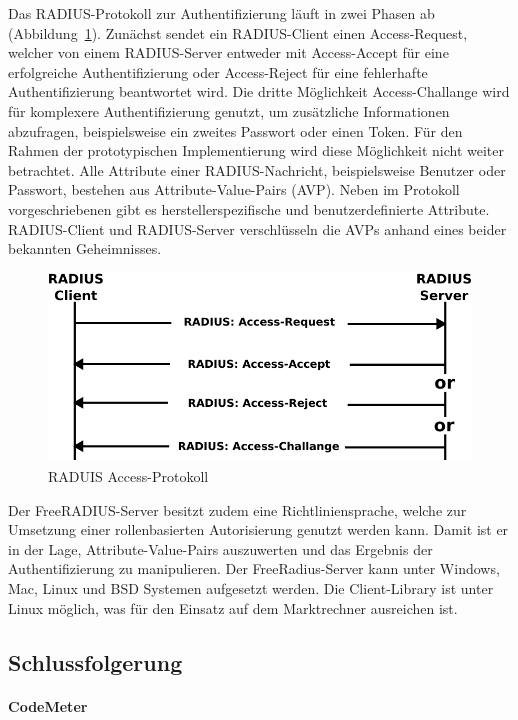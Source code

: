 \documentclass[11pt,a4paper]{report}
\begin{document}
Das RADIUS-Protokoll zur Authentifizierung läuft in zwei Phasen ab (Abbildung~\ref{fig:radius_access}). Zunächst sendet ein RADIUS-Client einen Access-Request, welcher von einem RADIUS-Server entweder mit Access-Accept für eine erfolgreiche Authentifizierung oder Access-Reject für eine fehlerhafte Authentifizierung beantwortet wird. Die dritte Möglichkeit Access-Challange wird für komplexere Authentifizierung genutzt, um zusätzliche Informationen abzufragen, beispielsweise ein zweites Passwort oder einen Token. Für den Rahmen der prototypischen Implementierung wird diese Möglichkeit nicht weiter betrachtet. Alle Attribute einer RADIUS-Nachricht, beispielsweise Benutzer oder Passwort, bestehen aus Attribute-Value-Pairs (AVP). Neben im Protokoll vorgeschriebenen gibt es herstellerspezifische und benutzerdefinierte Attribute. RADIUS-Client und RADIUS-Server verschlüsseln die AVPs anhand eines beider bekannten Geheimnisses.

\begin{figure}[htbp]
\centering
\includegraphics[scale=0.8]{images/RADIUS_access.pdf}
\caption{RADUIS Access-Protokoll}
\label{fig:radius_access}
\end{figure}

Der FreeRADIUS-Server besitzt zudem eine Richtliniensprache, welche zur Umsetzung einer rollenbasierten Autorisierung genutzt werden kann. Damit ist er in der Lage, Attribute-Value-Pairs auszuwerten und das Ergebnis der Authentifizierung zu manipulieren. Der FreeRadius-Server kann unter Windows, Mac, Linux und BSD Systemen aufgesetzt werden. Die Client-Library ist unter Linux möglich, was für den Einsatz auf dem Marktrechner ausreichen ist.

\subsection{Schlussfolgerung}

\paragraph{CodeMeter}
\end{document}
